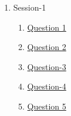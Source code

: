 \clearpage
\renewcommand{\notetitle}{Table of Contents}
\label{toc}
\begin{enumerate}

\item Session-1
\begin{enumerate}
\item \hyperref[202501120904]{Question 1}
\item \hyperref[202501121340]{Question 2}
\item \hyperref[202501121522]{Question-3}
\item \hyperref[202501121636]{Question-4}
\item \hyperref[202501121712]{Question 5}
\end{enumerate}
\end{enumerate}

\newpage
